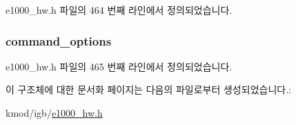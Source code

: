 e1000\+\_\+hw.\+h 파일의 464 번째 라인에서 정의되었습니다.

\subsubsection[{\texorpdfstring{command\+\_\+options}{command_options}}]{ command\+\_\+options}\hypertarget{structe1000__host__command__header_a5d5da570ec52b23cfc64a1f80d37f527}{}\label{structe1000__host__command__header_a5d5da570ec52b23cfc64a1f80d37f527}


e1000\+\_\+hw.\+h 파일의 465 번째 라인에서 정의되었습니다.



이 구조체에 대한 문서화 페이지는 다음의 파일로부터 생성되었습니다.\+:\begin{DoxyCompactItemize}
\item 
kmod/igb/\hyperlink{kmod_2igb_2e1000__hw_8h}{e1000\+\_\+hw.\+h}\end{DoxyCompactItemize}
